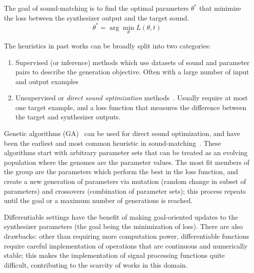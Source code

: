\documentclass[lettersize,journal]{IEEEtran}
\providecommand{\gls}[1]{#1}
\begin{document}
The goal of sound-matching is to find the optimal parameters $\theta^*$ that minimize the loss between the synthesizer output and the target sound. 
\[
\theta^* = \arg\min_{\theta} L(\theta,t)
\]


The heuristics in past works can be broadly split into two categories:
\begin{enumerate}
    \item Supervised (or inference) methods which use datasets of sound and parameter pairs to describe the generation objective. Often with a large number of input and output examples~\cite{engel2020ddsp,salimi2020make,yee2018automatic,esling2019flow}
    \item Unsupervised or \textit{direct sound optimization} methods~\cite{horner1993machine,mitchell2007evolutionary,yee2018automatic,vahidi2023mesostructures}. Usually require at most one target example, and a loss function that measures the difference between the target and synthesizer outputs. 
\end{enumerate}

Genetic algorithms (\gls{GA})~\cite{holland1992genetic} can be used for direct sound optimization, and have been the earliest and most common heuristic in sound-matching~\cite{horner1993machine,mitchell2007evolutionary,yee2018automatic}. These algorithms start with arbitrary parameter sets that can be treated as an evolving population where the genomes are the parameter values. The most fit members of the group are the parameters which perform the best in the loss function, and create a new generation of parameters via mutation (random change in subset of parameters) and crossovers (combination of parameter sets); this process repeats until the goal or a maximum number of generations is reached. 

 Differentiable settings have the benefit of making goal-oriented updates to the synthesizer parameters (the goal being the minimization of loss). There are also drawbacks: other than requiring more computation power, differentiable functions require careful implementation of operations that are continuous and numerically stable; this makes the implementation of signal processing functions quite difficult, contributing to the scarcity of works in this domain.

\end{document}

